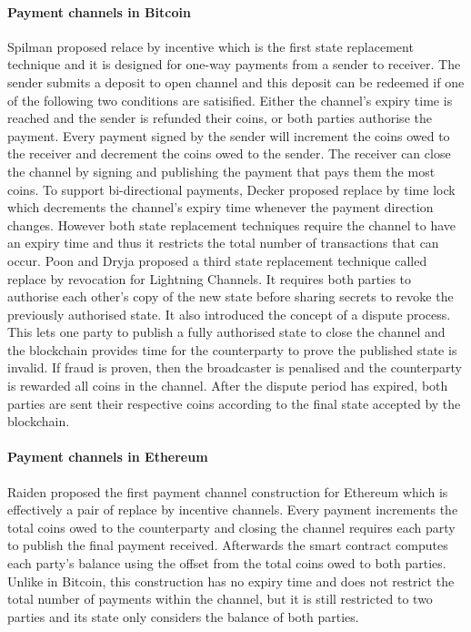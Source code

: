 \documentclass{llncs}
\begin{document}
\paragraph{Payment channels in Bitcoin} 
Spilman proposed relace by incentive which is the first state replacement technique and it is designed for one-way payments from a sender to receiver.
The sender submits a deposit to open  channel and this deposit can be redeemed if one of the following two conditions are satisified. 
Either the channel's expiry time is reached and the sender is refunded their coins, or both parties authorise the payment. 
Every payment signed by the sender will increment the coins owed to the receiver and decrement the coins owed to the sender.  
The receiver can close the channel by signing and publishing the payment that pays them the most coins. 
To support bi-directional payments, Decker proposed replace by time lock which decrements the channel's expiry time whenever the payment direction changes.
However both state replacement techniques require the channel to have an expiry time and thus it restricts the total number of transactions that can occur. 
Poon and Dryja proposed a third state replacement technique called replace by revocation for Lightning Channels.  
It requires both parties to authorise each other's copy of the new state before sharing secrets to revoke the previously authorised state. 
It also introduced the concept of a dispute process.
This lets one party to publish a fully authorised state to close the channel and the blockchain provides time for the counterparty to prove the published state is invalid.
If fraud is proven, then the broadcaster is penalised and the counterparty is rewarded all coins in the channel.
After the dispute period has expired, both parties are sent their respective coins according to the final state accepted by the blockchain. 


\paragraph{Payment channels in Ethereum}
Raiden proposed the first payment channel construction for Ethereum which is effectively a pair of replace by incentive channels. 
Every payment increments the total coins owed to the counterparty and closing the channel requires each party to publish the final payment received. 
Afterwards the smart contract computes each party's balance using the offset from the total coins owed to both parties. 
Unlike in Bitcoin, this construction has no expiry time and does not restrict the total number of payments within the channel, but it is still restricted to two parties and its state only considers the balance of both parties. 
\end{document}
